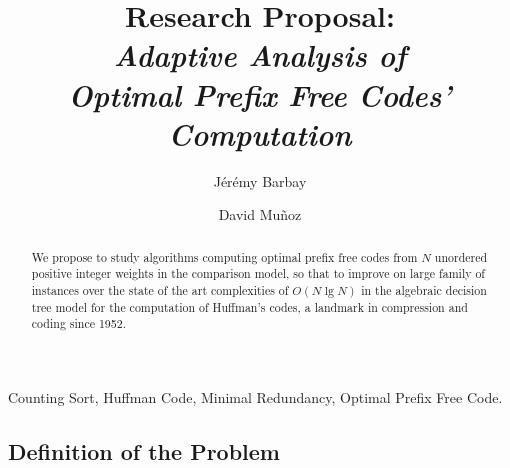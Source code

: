 \documentclass{llncs}
\begin{document}
\pagestyle{headings}  %
\addtocmark{                    }

\mainmatter              %
\title{ {\small Research Proposal:} \\ \emph{Adaptive Analysis of \\ Optimal Prefix Free Codes' \\ Computation}  }
%
\author{J\'er\'emy Barbay \and David Mu{\~n}oz}
%
%

\maketitle              %

\begin{abstract}
We propose to study algorithms computing optimal prefix free codes from $N$ unordered positive integer weights in the comparison model, so that to improve on large family of instances over the state of the art complexities of $O(N\lg N)$ in the algebraic decision tree model for the computation of Huffman's codes, a landmark in compression and coding since 1952.
\end{abstract}


\begin{center}
  \begin{minipage}{.9\textwidth}
    Counting Sort, 
    Huffman Code,
    Minimal Redundancy,
    Optimal Prefix Free Code. 
\end{minipage}
\end{center}


\subsection*{Definition of the Problem}
\end{document}
